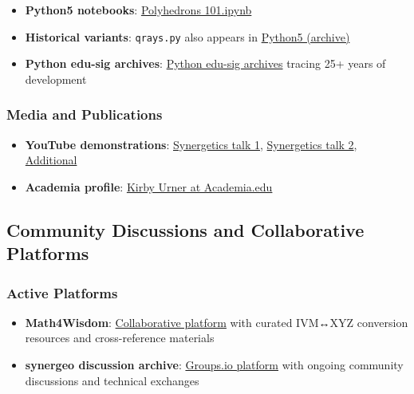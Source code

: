 \documentclass[
  10pt,
]{article}
\newcommand{\passthrough}[1]{#1}
\providecommand{\tightlist}{%
  \setlength{\itemsep}{0pt}\setlength{\parskip}{0pt}}
\begin{document}
\begin{itemize}
\tightlist
\item
  \textbf{Python5 notebooks}:
  \href{https://raw.githubusercontent.com/4dsolutions/Python5/master/Polyhedrons\%20101.ipynb}{Polyhedrons
  101.ipynb}
\item
  \textbf{Historical variants}: \passthrough{\lstinline!qrays.py!} also
  appears in
  \href{https://github.com/4dsolutions/Python5/blob/master/qrays.py}{Python5
  (archive)}
\item
  \textbf{Python edu-sig archives}:
  \href{https://mail.python.org/pipermail/edu-sig/2000-May/000498.html}{Python
  edu-sig archives} tracing 25+ years of development
\end{itemize}

\hypertarget{media-and-publications}{%
\subsubsection{Media and Publications}\label{media-and-publications}}

\begin{itemize}
\tightlist
\item
  \textbf{YouTube demonstrations}:
  \href{https://www.youtube.com/watch?v=g14mu4uWD4E}{Synergetics talk
  1}, \href{https://www.youtube.com/watch?v=i9oij02oje0}{Synergetics
  talk 2},
  \href{https://www.youtube.com/watch?v=D0M1h_gjA_w}{Additional}
\item
  \textbf{Academia profile}:
  \href{https://princeton.academia.edu/kirbyurner}{Kirby Urner at
  Academia.edu}
\end{itemize}

\hypertarget{community-discussions-and-collaborative-platforms}{%
\subsection{Community Discussions and Collaborative
Platforms}\label{community-discussions-and-collaborative-platforms}}

\hypertarget{active-platforms}{%
\subsubsection{Active Platforms}\label{active-platforms}}

\begin{itemize}
\tightlist
\item
  \textbf{Math4Wisdom}:
  \href{https://coda.io/@daniel-ari-friedman/math4wisdom/ivm-xyz-40}{Collaborative
  platform} with curated IVM↔XYZ conversion resources and
  cross-reference materials
\item
  \textbf{synergeo discussion archive}:
  \href{https://groups.io/g/synergeo/topics}{Groups.io platform} with
  ongoing community discussions and technical exchanges
\end{itemize}
\end{document}
